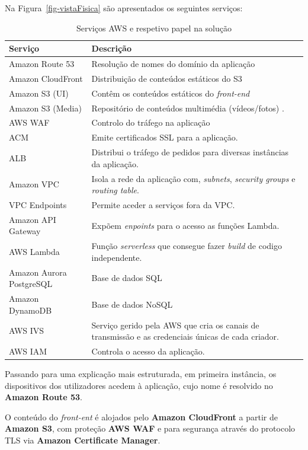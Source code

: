 Na Figura~\ref{fig-vistaFisica} são apresentados os seguintes serviços:
\begin{table}[H]
\centering
\small
\caption{Serviços AWS e respetivo papel na solução}
\label{tab:aws-servicos}
\begin{tabular}{|p{4.3cm}|p{9.7cm}|}
\hline
\textbf{Serviço} & \textbf{Descrição} \\ \hline
Amazon Route 53 & Resolução de nomes do domínio da aplicação\\ \hline
Amazon CloudFront & Distribuição de conteúdos estáticos do S3\\ \hline
Amazon S3 (UI) & Contêm os conteúdos estáticos do \textit{front-end} \\ \hline
Amazon S3 (Media) & Repositório de conteúdos multimédia (vídeos/fotos) . \\ \hline
AWS \gls{WAF} & Controlo do tráfego na aplicação\\ \hline
\gls{ACM} & Emite certificados \gls{SSL} para a aplicação. \\ \hline
\gls{ALB} & Distribui o tráfego de pedidos para diversas instâncias da aplicação. \\ \hline
Amazon \gls{VPC} & Isola a rede da aplicação com, \textit{subnets}, \textit{security groups} e \textit{routing table}. \\ \hline
VPC Endpoints & Permite aceder a serviços fora da VPC. \\ \hline
Amazon API Gateway & Expõem \textit{enpoints} para o acesso as funções Lambda. \\ \hline
AWS Lambda & Função \textit{serverless} que consegue fazer \textit{build} de codigo independente. \\ \hline
Amazon Aurora PostgreSQL & Base de dados SQL \\ \hline
Amazon DynamoDB & Base de dados NoSQL\\ \hline
AWS \gls{IVS} & Serviço gerido pela AWS que cria os canais de transmissão e as credenciais únicas de cada criador. \\ \hline
AWS \gls{IAM} & Controla o acesso da aplicação. \\ \hline
\end{tabular}
\end{table}


Passando para uma explicação mais estruturada, em primeira instância, os dispositivos dos utilizadores acedem à aplicação, cujo nome é resolvido no \textbf{Amazon Route 53}.

O conteúdo do \textit{front-ent} é alojados pelo \textbf{Amazon CloudFront} a partir de \textbf{Amazon S3}, com proteção \textbf{AWS WAF} e para segurança através do protocolo \gls{TLS} via \textbf{Amazon Certificate Manager}.

